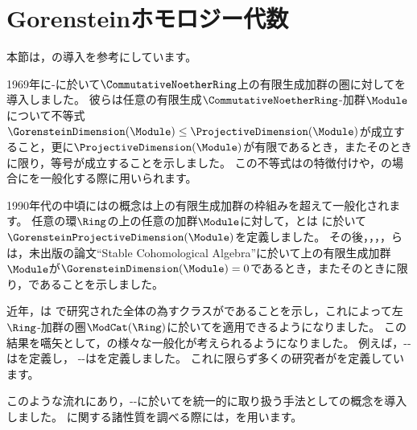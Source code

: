 \section{Gorensteinホモロジー代数}

本節は，\cite{becerril2019relativegorensteinobjectsabelian}の導入を参考にしています。

1969年に\WordAuslander-\WordBridger\cite{auslander1969stable}に於いて\WordCommutativeNoetherianRing\( \CommutativeNoetherRing \)上の有限生成加群の圏に対して\WordGorensteinDimension を導入しました。
彼らは任意の有限生成\( \CommutativeNoetherRing \)-加群\( \Module \)について不等式\( \GorensteinDimension(\Module) \leq \ProjectiveDimension(\Module) \)が成立すること，更に\( \ProjectiveDimension(\Module) \)が有限であるとき，またそのときに限り，等号が成立することを示しました。
この不等式は\WordGorensteinLocalRing の特徴付けや，\WordGorensteinDimension の場合に\WordAuslanderBuchsbaumFormula を一般化する際に用いられます。

1990年代の中頃には\WordGorensteinDimension の概念は\WordCommutativeNoetherianRing 上の有限生成加群の枠組みを超えて一般化されます。
任意の環\( \Ring \)の上の任意の加群\( \Module \)に対して，\WordEnochs と\WordJenda は%
に於いて\WordGorensteinProjectiveDimension\( \GorensteinProjectiveDimension(\Module) \)を定義しました。
その後，\WordAvramov，\WordBuchweitz，\WordMartsinkovsky，\WordReiten らは，未出版の論文``Stable Cohomological Algebra''に於いて\WordNoetherianRing 上の有限生成加群\( \Module \)が\( \GorensteinDimension(\Module) = 0 \)であるとき，またそのときに限り，\WordGorensteinProjective であることを示しました。

近年，\WordHolm は%
で研究された\WordGorensteinModule 全体の為すクラスが\WordResolvingClass であることを示し，これによって左\( \Ring \)-加群の圏\( \ModCat(\Ring) \)に於いて\WordRelativeHomologicalAlgebra を適用できるようになりました。
この結果を嚆矢として，\WordGorensteinModule の様々な一般化が考えられるようになりました。
例えば，\WordBravo-\WordGuillespie-\WordHovey は\WordACGorensteinProjectiveModule を定義し，
\WordDing-\WordLi-\WordMao は\WordDingProjectiveModule を定義しました。
これに限らず多くの研究者が\WordGorensteinObject を定義しています。

このような流れにあり，\WordBecerril-\WordMendoza-\WordSantiago\cite{becerril2019relativegorensteinobjectsabelian}に於いて\WordGorensteinObject を統一的に取り扱う手法として\WordRelativeGorensteinObject の概念を導入しました。
\WordRelativeGorensteinObject に関する諸性質を調べる際には，\WordAuslanderBuchweitzApproximationTheory を用います。

